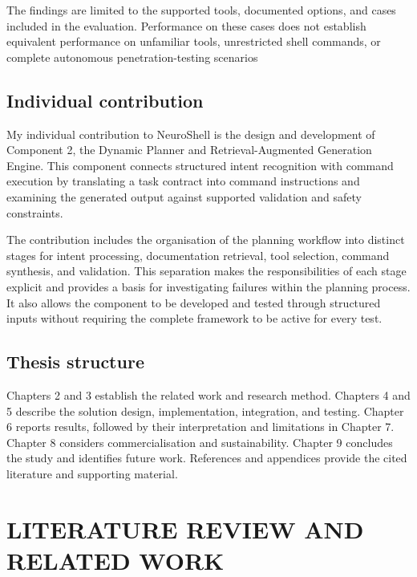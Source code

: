 \documentclass[
]{article}
\begin{document}
The findings are limited to the supported tools, documented options, and
cases included in the evaluation. Performance on these cases does not
establish equivalent performance on unfamiliar tools, unrestricted shell
commands, or complete autonomous penetration-testing scenarios

\hypertarget{individual-contribution}{%
\subsection{\texorpdfstring{ Individual
contribution}{ Individual contribution}}\label{individual-contribution}}

My individual contribution to NeuroShell is the design and development
of Component 2, the Dynamic Planner and Retrieval-Augmented Generation
Engine. This component connects structured intent recognition with
command execution by translating a task contract into command
instructions and examining the generated output against supported
validation and safety constraints.

The contribution includes the organisation of the planning workflow into
distinct stages for intent processing, documentation retrieval, tool
selection, command synthesis, and validation. This separation makes the
responsibilities of each stage explicit and provides a basis for
investigating failures within the planning process. It also allows the
component to be developed and tested through structured inputs without
requiring the complete framework to be active for every test.

\hypertarget{thesis-structure}{%
\subsection{Thesis structure}\label{thesis-structure}}

Chapters 2 and 3 establish the related work and research method.
Chapters 4 and 5 describe the solution design, implementation,
integration, and testing. Chapter 6 reports results, followed by their
interpretation and limitations in Chapter 7. Chapter 8 considers
commercialisation and sustainability. Chapter 9 concludes the study and
identifies future work. References and appendices provide the cited
literature and supporting material.

\hypertarget{literature-review-and-related-work}{%
\section{\texorpdfstring{ LITERATURE REVIEW AND RELATED
WORK}{ LITERATURE REVIEW AND RELATED WORK}}\label{literature-review-and-related-work}}
\end{document}
